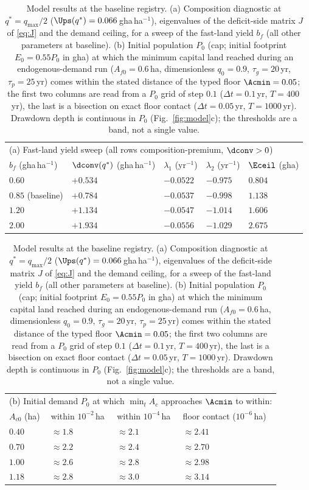 \begin{table}[!htbp]
\centering\small
\caption{Model results at the baseline registry. (a) Composition diagnostic at $q^*=q_{\max}/2$ ($\Ups(q^*)=0.066$\,gha\,ha$^{-1}$), eigenvalues of the deficit-side matrix $J$ of \eqref{eq:J} and the demand ceiling, for a sweep of the fast-land yield $b_f$ (all other parameters at baseline). (b) Initial population $P_0$ (cap; initial footprint $E_0=0.55P_0$ in gha) at which the minimum capital land reached during an endogenous-demand run ($A_{f0}=0.6$\,ha, dimensionless $q_0=0.9$, $\tau_g=20$\,yr, $\tau_p=25$\,yr) comes within the stated distance of the typed floor $\Acmin=0.05$; the first two columns are read from a $P_0$ grid of step $0.1$ ($\Delta t=0.1$\,yr, $T=400$\,yr), the last is a bisection on exact floor contact ($\Delta t=0.05$\,yr, $T=1000$\,yr). Drawdown depth is continuous in $P_0$ (Fig.~\ref{fig:model}c); the thresholds are a band, not a single value.}
\label{tab:model}
\begin{tabular}{l l l l l}
\toprule
\multicolumn{5}{l}{(a) Fast-land yield sweep (all rows composition-premium, $\dconv>0$)}\\
$b_f$ (gha\,ha$^{-1}$) & $\dconv(q^*)$ (gha\,ha$^{-1}$) & $\lambda_1$ (yr$^{-1}$) & $\lambda_2$ (yr$^{-1}$) & $\Eceil$ (gha) \\
\midrule
$0.60$ & $+0.534$ & $-0.0522$ & $-0.975$ & $0.804$ \\
$0.85$ (baseline) & $+0.784$ & $-0.0537$ & $-0.998$ & $1.138$ \\
$1.20$ & $+1.134$ & $-0.0547$ & $-1.014$ & $1.606$ \\
$2.00$ & $+1.934$ & $-0.0556$ & $-1.029$ & $2.675$ \\
\bottomrule
\end{tabular}

\medskip
\begin{tabular}{l l l l}
\toprule
\multicolumn{4}{l}{(b) Initial demand $P_0$ at which $\min_tA_c$ approaches $\Acmin$ to within:}\\
$A_{c0}$ (ha) & within $10^{-2}$\,ha & within $10^{-4}$\,ha & floor contact ($10^{-6}$\,ha) \\
\midrule
$0.40$ & $\approx1.8$ & $\approx2.1$ & $\approx2.41$ \\
$0.70$ & $\approx2.2$ & $\approx2.4$ & $\approx2.70$ \\
$1.00$ & $\approx2.6$ & $\approx2.8$ & $\approx2.98$ \\
$1.18$ & $\approx2.8$ & $\approx3.0$ & $\approx3.14$ \\
\bottomrule
\end{tabular}
\end{table}

